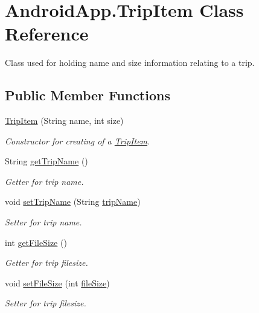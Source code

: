 \hypertarget{class_android_app_1_1_trip_item}{}\section{Android\+App.\+Trip\+Item Class Reference}
\label{class_android_app_1_1_trip_item}


Class used for holding name and size information relating to a trip.  


\subsection*{Public Member Functions}
\begin{DoxyCompactItemize}
\item 
\hyperlink{class_android_app_1_1_trip_item_a3ef9684be0d75a972fc373db43aa0efd}{Trip\+Item} (String name, int size)
\begin{DoxyCompactList}\small\item\em Constructor for creating of a \hyperlink{class_android_app_1_1_trip_item}{Trip\+Item}. \end{DoxyCompactList}\item 
String \hyperlink{class_android_app_1_1_trip_item_ae7d202ccb169b225ed3c7f5b6b0fb9eb}{get\+Trip\+Name} ()
\begin{DoxyCompactList}\small\item\em Getter for trip name. \end{DoxyCompactList}\item 
void \hyperlink{class_android_app_1_1_trip_item_a6c1705dd48325abf0a0abbda977df903}{set\+Trip\+Name} (String \hyperlink{class_android_app_1_1_trip_item_ae5137b0b6077e3fcf293430bc9c488e3}{trip\+Name})
\begin{DoxyCompactList}\small\item\em Setter for trip name. \end{DoxyCompactList}\item 
int \hyperlink{class_android_app_1_1_trip_item_a565ec50649fe1edf5db7301ec3f10497}{get\+File\+Size} ()
\begin{DoxyCompactList}\small\item\em Getter for trip filesize. \end{DoxyCompactList}\item 
void \hyperlink{class_android_app_1_1_trip_item_a85d328bdc6fd3d54c5c275aea2e23852}{set\+File\+Size} (int \hyperlink{class_android_app_1_1_trip_item_a0689a1340427784d8658cc616da310f2}{file\+Size})
\begin{DoxyCompactList}\small\item\em Setter for trip filesize. \end{DoxyCompactList}\end{DoxyCompactItemize}
